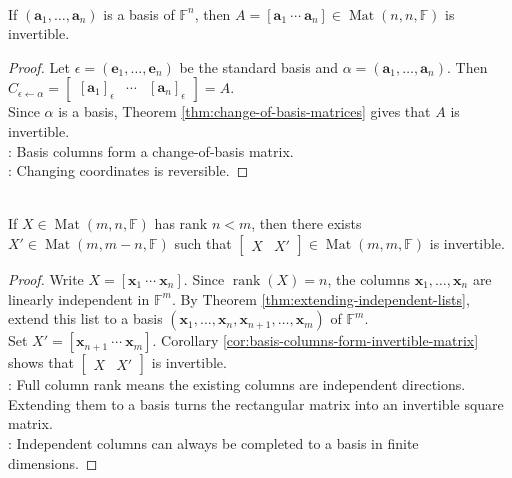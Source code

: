 \begin{corollary} \label{cor:basis-columns-form-invertible-matrix} \\
If $(\mathbf{a}_1,\ldots,\mathbf{a}_n)$ is a basis of $\mathbb{F}^n$, then $A=[\mathbf{a}_1\ \cdots\ \mathbf{a}_n]\in\operatorname{Mat}(n,n,\mathbb{F})$ is invertible.
\begin{proof}
Let $\epsilon=(\mathbf{e}_1,\ldots,\mathbf{e}_n)$ be the standard basis and $\alpha=(\mathbf{a}_1,\ldots,\mathbf{a}_n)$. Then
$C_{\epsilon \leftarrow \alpha} =
\begin{bmatrix}
[\mathbf{a}_1]_{\epsilon} & \cdots & [\mathbf{a}_n]_{\epsilon}
\end{bmatrix} =A$.\\
Since $\alpha$ is a basis, Theorem \ref{thm:change-of-basis-matrices} gives that $A$ is invertible.\\
: Basis columns form a change-of-basis matrix.\\
: Changing coordinates is reversible.
\end{proof}
\end{corollary}

\begin{theorem} \label{thm:complete-full-column-rank-matrix} \\
If $X\in\operatorname{Mat}(m,n,\mathbb{F})$ has rank $n<m$, then there exists $X'\in\operatorname{Mat}(m,m-n,\mathbb{F})$ such that $\begin{bmatrix}X & X'\end{bmatrix}\in\operatorname{Mat}(m,m,\mathbb{F})$ is invertible.
\begin{proof}
Write $X=[\mathbf{x}_1\ \cdots\ \mathbf{x}_n]$. Since $\operatorname{rank}(X)=n$, the columns $\mathbf{x}_1,\ldots,\mathbf{x}_n$ are linearly independent in $\mathbb{F}^m$. By Theorem \ref{thm:extending-independent-lists}, extend this list to a basis $(\mathbf{x}_1,\ldots,\mathbf{x}_n,\mathbf{x}_{n+1},\ldots,\mathbf{x}_m)$ of $\mathbb{F}^m$.\\
Set $X'=[\mathbf{x}_{n+1}\ \cdots\ \mathbf{x}_m]$. Corollary \ref{cor:basis-columns-form-invertible-matrix} shows that $\begin{bmatrix}X & X'\end{bmatrix}$ is invertible.\\
: Full column rank means the existing columns are independent directions. Extending them to a basis turns the rectangular matrix into an invertible square matrix.\\
: Independent columns can always be completed to a basis in finite dimensions.
\end{proof}
\end{theorem}

